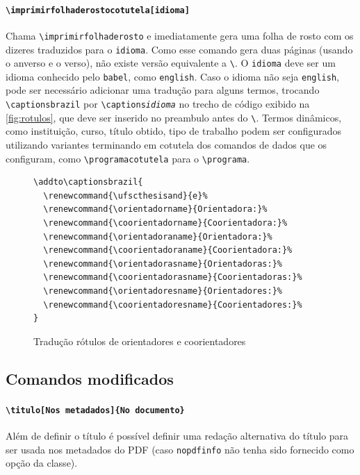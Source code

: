 \documentclass[embeddedlogo]{ufsc-thesis-rn46-2019}
\newcommand{\lacmd}[1]{\texttt{\textbackslash{}#1}}
\begin{document}
\paragraph*{\lacmd{imprimirfolhaderostocotutela[idioma]}} Chama
\lacmd{imprimirfolhaderosto} e imediatamente gera uma folha de rosto com os
dizeres traduzidos para o \texttt{idioma}. Como esse comando gera duas páginas
(usando o anverso e o verso), não existe versão equivalente a
\lacmd{\imprimirfolhaderosto*}. O \texttt{idioma} deve ser um idioma conhecido
pelo \texttt{babel}, como \texttt{english}. Caso o idioma não seja
\texttt{english}, pode ser necessário adicionar uma tradução para alguns termos,
trocando \lacmd{captionsbrazil} por \lacmd{captions\emph{idioma}} no trecho de
código exibido na \autoref{fig:rotulos}, que deve ser inserido no preambulo
antes do \lacmd{\imprimirfolhaderostocotutela}. Termos dinâmicos, como
instituição, curso, título obtido, tipo de trabalho podem ser configurados
utilizando variantes terminando em cotutela dos comandos de dados que os
configuram, como \lacmd{programacotutela} para o \lacmd{programa}.


\begin{figure}[tb]
  \centering
\begin{verbatim}
\addto\captionsbrazil{
  \renewcommand{\ufscthesisand}{e}%
  \renewcommand{\orientadorname}{Orientadora:}%
  \renewcommand{\coorientadorname}{Coorientadora:}%
  \renewcommand{\orientadoraname}{Orientadora:}%
  \renewcommand{\coorientadoraname}{Coorientadora:}%
  \renewcommand{\orientadorasname}{Orientadoras:}%
  \renewcommand{\coorientadorasname}{Coorientadoras:}%
  \renewcommand{\orientadoresname}{Orientadores:}%
  \renewcommand{\coorientadoresname}{Coorientadores:}%
}
\end{verbatim}
  \caption{Tradução rótulos de orientadores e coorientadores}
  \label{fig:rotulos}
\end{figure}

\subsection{Comandos \abnTeX{} modificados}

\paragraph*{\lacmd{titulo[Nos metadados]\{No documento\}}} Além de definir o título é
possível definir uma redação alternativa do título para ser usada nos metadados
do PDF (caso \texttt{nopdfinfo} não tenha sido fornecido como opção da classe).
\end{document}
